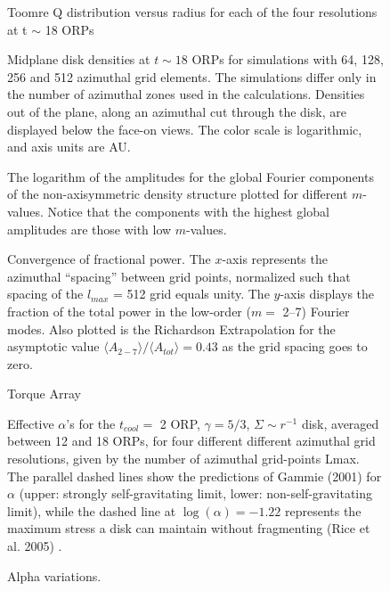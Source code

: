 \documentclass[manuscript]{aastex}
\begin{document}
\begin{figure}
\caption{Toomre Q distribution versus radius for each of the four resolutions at t $\sim$ 18 ORPs}
\label{fig:Final_Q}
\end{figure}

\begin{figure}
\caption
{
Midplane disk densities at $t \sim 18$ ORPs for simulations with 64, 128, 256 and 512 azimuthal grid elements.
The simulations differ only in the number of  azimuthal zones used in the calculations.  Densities out of the plane, along an azimuthal cut through the disk, are displayed below the face-on views.  The color scale is  logarithmic, and axis units are AU. 
}
\label{fig:DensityPlots}
\end{figure}
\newpage

\begin{figure}
\caption
{
The logarithm of the amplitudes for the global Fourier components of the non-axisymmetric density structure plotted for different $m$-values. Notice that the components with the highest global amplitudes are those with low $m$-values.  
}
\label{fig:Am_vs_log_m}
\end{figure}

\begin{figure}
\caption
{
Convergence of fractional power.  The $x$-axis represents
the azimuthal ``spacing'' between grid points,  normalized such that spacing of the $l_{max}$ = 512 grid
equals unity.
The $y$-axis displays the fraction of the total power in the low-order ($m = $ 2--7) Fourier modes. 
Also plotted is the Richardson Extrapolation for the asymptotic value  
$\langle A_{2-7} \rangle / \langle A_{tot} \rangle = 0.43$ as the grid spacing goes to zero.  
}
\end{figure}

\begin{figure}
\caption
{
Torque Array}
\end{figure}


\begin{figure}
\label{fig:alpha_v_radius}
\caption
{Effective $\alpha$'s for the $t_{cool} =$ 2 ORP, $\gamma = 5/3$, $\Sigma \sim r^{ -1}$ disk, averaged between 12 and 18 ORPs, for four different different azimuthal grid resolutions, given by the number of azimuthal grid-points Lmax. The parallel dashed lines show the predictions of Gammie (2001) for $\alpha$ (upper: strongly self-gravitating limit, lower: non-self-gravitating limit), while the dashed line at $\log(\alpha) = -1.22$ represents the maximum stress a disk can maintain without fragmenting (Rice et al. 2005) . 
}
\end{figure}
\newpage

\begin{figure}
\caption
{Alpha variations.}
\end{figure}
\end{document}
